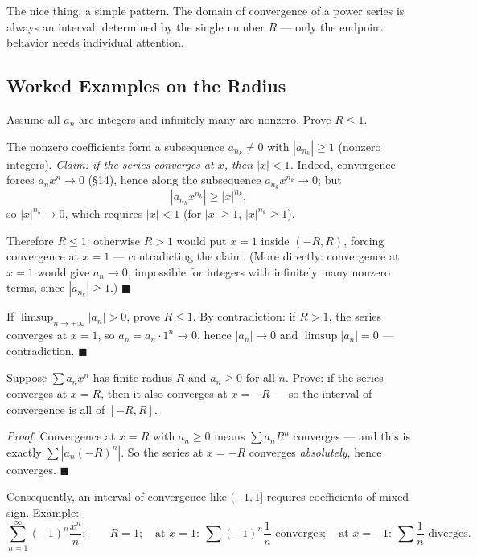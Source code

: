 \documentclass[11pt]{report}
\begin{document}
\begin{rembox}
The nice thing: a simple pattern. The domain of convergence of a power series is always an interval, determined by the single number $R$ --- only the endpoint behavior needs individual attention.
\end{rembox}

\subsection{Worked Examples on the Radius}

\begin{exbox}
Assume all $a_n$ are integers and infinitely many are nonzero. Prove $R \leq 1$.

The nonzero coefficients form a subsequence $a_{n_k} \neq 0$ with $|a_{n_k}| \geq 1$ (nonzero integers). \emph{Claim: if the series converges at $x$, then $|x| < 1$.} Indeed, convergence forces $a_n x^n \to 0$ (\S 14), hence along the subsequence $a_{n_k} x^{n_k} \to 0$; but
\[
|a_{n_k} x^{n_k}| \geq |x|^{n_k},
\]
so $|x|^{n_k} \to 0$, which requires $|x| < 1$ (for $|x| \geq 1$, $|x|^{n_k} \geq 1$).

Therefore $R \leq 1$: otherwise $R > 1$ would put $x = 1$ inside $(-R, R)$, forcing convergence at $x = 1$ --- contradicting the claim. (More directly: convergence at $x = 1$ would give $a_n \to 0$, impossible for integers with infinitely many nonzero terms, since $|a_{n_k}| \geq 1$.) \hfill $\blacksquare$
\end{exbox}

\begin{exbox}
If $\limsup_{n\to+\infty} |a_n| > 0$, prove $R \leq 1$. By contradiction: if $R > 1$, the series converges at $x = 1$, so $a_n = a_n \cdot 1^n \to 0$, hence $|a_n| \to 0$ and $\limsup |a_n| = 0$ --- contradiction. \hfill $\blacksquare$
\end{exbox}

\begin{exbox}
Suppose $\sum a_n x^n$ has finite radius $R$ and $a_n \geq 0$ for all $n$. Prove: if the series converges at $x = R$, then it also converges at $x = -R$ --- so the interval of convergence is all of $[-R, R]$.

\emph{Proof.} Convergence at $x = R$ with $a_n \geq 0$ means $\sum a_n R^n$ converges --- and this is exactly $\sum |a_n(-R)^n|$. So the series at $x = -R$ converges \emph{absolutely}, hence converges. \hfill $\blacksquare$

Consequently, an interval of convergence like $(-1, 1]$ requires coefficients of mixed sign. Example:
\[
\sum_{n=1}^\infty (-1)^n \frac{x^n}{n}: \qquad R = 1; \quad \text{at } x = 1: \ \textstyle\sum(-1)^n\frac1n \text{ converges}; \quad \text{at } x = -1: \ \textstyle\sum \frac1n \text{ diverges}.
\]
\end{exbox}
\end{document}
